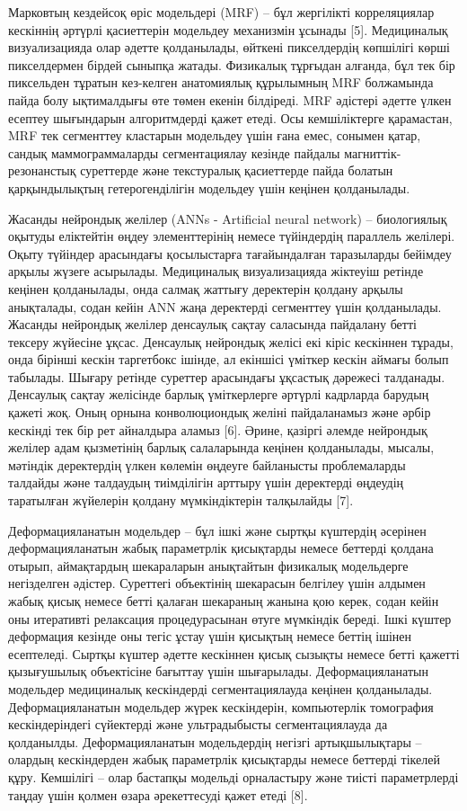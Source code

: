 Марковтың кездейсоқ өріс модельдері (MRF) -- бұл жергілікті
корреляциялар кескіннің әртүрлі қасиеттерін модельдеу механизмін ұсынады
{[}5{]}. Медициналық визуализацияда олар әдетте қолданылады, өйткені
пикселдердің көпшілігі көрші пикселдермен бірдей сыныпқа жатады.
Физикалық тұрғыдан алғанда, бұл тек бір пиксельден тұратын кез-келген
анатомиялық құрылымның MRF болжамында пайда болу ықтималдығы өте төмен
екенін білдіреді. MRF әдістері әдетте үлкен есептеу шығындарын
алгоритмдерді қажет етеді. Осы кемшіліктерге қарамастан, MRF тек
сегменттеу кластарын модельдеу үшін ғана емес, сонымен қатар, сандық
маммограммаларды сегментациялау кезінде пайдалы магниттік-резонанстық
суреттерде және текстуралық қасиеттерде пайда болатын қарқындылықтың
гетерогенділігін модельдеу үшін кеңінен қолданылады.

Жасанды нейрондық желілер (ANNs - Artificial neural network) --
биологиялық оқытуды еліктейтін өңдеу элементтерінің немесе түйіндердің
параллель желілері. Оқыту түйіндер арасындағы қосылыстарға тағайындалған
таразыларды бейімдеу арқылы жүзеге асырылады. Медициналық визуализацияда
жіктеуіш ретінде кеңінен қолданылады, онда салмақ жаттығу деректерін
қолдану арқылы анықталады, содан кейін ANN жаңа деректерді сегменттеу
үшін қолданылады. Жасанды нейрондық желілер денсаулық сақтау саласында
пайдалану бетті тексеру жүйесіне ұқсас. Денсаулық нейрондық желісі екі
кіріс кескіннен тұрады, онда бірінші кескін таргетбокс ішінде, ал
екіншісі үміткер кескін аймағы болып табылады. Шығару ретінде суреттер
арасындағы ұқсастық дәрежесі талданады. Денсаулық сақтау желісінде
барлық үміткерлерге әртүрлі кадрларда барудың қажеті жоқ. Оның орнына
конволюциондық желіні пайдаланамыз және әрбір кескінді тек бір рет
айналдыра аламыз {[}6{]}. Әрине, қазіргі әлемде нейрондық желілер адам
қызметінің барлық салаларында кеңінен қолданылады, мысалы, мәтіндік
деректердің үлкен көлемін өңдеуге байланысты проблемаларды талдайды және
талдаудың тиімділігін арттыру үшін деректерді өңдеудің таратылған
жүйелерін қолдану мүмкіндіктерін талқылайды {[}7{]}.

Деформацияланатын модельдер -- бұл ішкі және сыртқы күштердің әсерінен
деформацияланатын жабық параметрлік қисықтарды немесе беттерді қолдана
отырып, аймақтардың шекараларын анықтайтын физикалық модельдерге
негізделген әдістер. Суреттегі объектінің шекарасын белгілеу үшін
алдымен жабық қисық немесе бетті қалаған шекараның жанына қою керек,
содан кейін оны итеративті релаксация процедурасынан өтуге мүмкіндік
береді. Ішкі күштер деформация кезінде оны тегіс ұстау үшін қисықтың
немесе беттің ішінен есептеледі. Сыртқы күштер әдетте кескіннен қисық
сызықты немесе бетті қажетті қызығушылық объектісіне бағыттау үшін
шығарылады. Деформацияланатын модельдер медициналық кескіндерді
сегментациялауда кеңінен қолданылады. Деформацияланатын модельдер жүрек
кескіндерін, компьютерлік томография кескіндеріндегі сүйектерді және
ультрадыбысты сегментациялауда да қолданылды. Деформацияланатын
модельдердің негізгі артықшылықтары -- олардың кескіндерден жабық
параметрлік қисықтарды немесе беттерді тікелей құру. Кемшілігі -- олар
бастапқы модельді орналастыру және тиісті параметрлерді таңдау үшін
қолмен өзара әрекеттесуді қажет етеді {[}8{]}.

